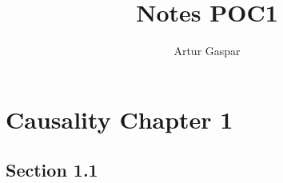 \documentclass[oneside]{book}
\title{Notes POC1}
\author{Artur Gaspar}
\begin{document}
\maketitle
\tableofcontents

\chapter{Causality Chapter 1}

\section{Section 1.1}


\end{document}
